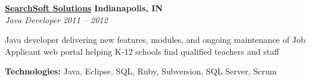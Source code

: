 %
    \headerrow
        {\textbf{\href{http://www.searchsoft.net/}{SearchSoft Solutions}}}
        {\textbf{Indianapolis, IN}}
    \\
    \headerrow
        {\emph{Java Developer}}
        {\emph{2011 -- 2012}}
    \begin{itemize*}
        \item Java developer delivering new features, modules, and ongoing maintenance of Job Applicant web portal
            helping K-12 schools find qualified teachers and staff
    \end{itemize*}

    \hspace{1.0em}
    \textbf{Technologies:} Java, Eclipse, SQL, Ruby, Subversion, SQL Server, Scrum
